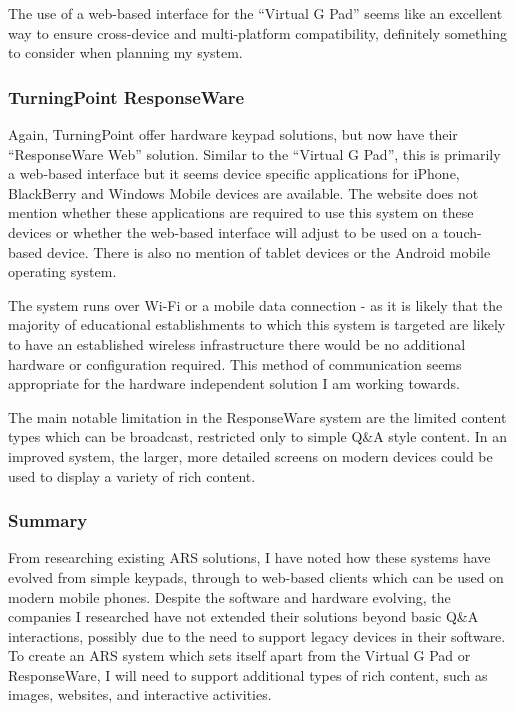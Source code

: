 \documentclass[a4papert,11pt,notitlepage]{ltxdoc}
\begin{document}
The use of a web-based interface for the ``Virtual G Pad'' seems like an excellent way to ensure cross-device and multi-platform compatibility, definitely something to consider when planning my system.

\subsubsection{TurningPoint ResponseWare}
Again, TurningPoint\cite{responseware:web} offer hardware keypad solutions, but now have their ``ResponseWare Web'' solution. Similar to the ``Virtual G Pad'', this is primarily a web-based interface but it seems device specific applications for iPhone, BlackBerry and Windows Mobile devices are available. The website does not mention whether these applications are required to use this system on these devices or whether the web-based interface will adjust to be used on a touch-based device. There is also no mention of tablet devices or the Android mobile operating system.

The system runs over Wi-Fi or a mobile data connection - as it is likely that the majority of educational establishments to which this system is targeted are likely to have an established wireless infrastructure there would be no additional hardware or configuration required. This method of communication seems appropriate for the hardware independent solution I am working towards.

The main notable limitation in the ResponseWare system are the limited content types which can be broadcast, restricted only to simple Q\&A style content. In an improved system, the larger, more detailed screens on modern devices could be used to display a variety of rich content.

\subsubsection{Summary}
From researching existing ARS solutions, I have noted how these systems have evolved from simple keypads, through to web-based clients which can be used on modern mobile phones. Despite the software and hardware evolving, the companies I researched have not extended their solutions beyond basic Q\&A interactions, possibly due to the need to support legacy devices in their software. To create an ARS system which sets itself apart from the Virtual G Pad or ResponseWare, I will need to support additional types of rich content, such as images, websites, and interactive activities.
\end{document}
